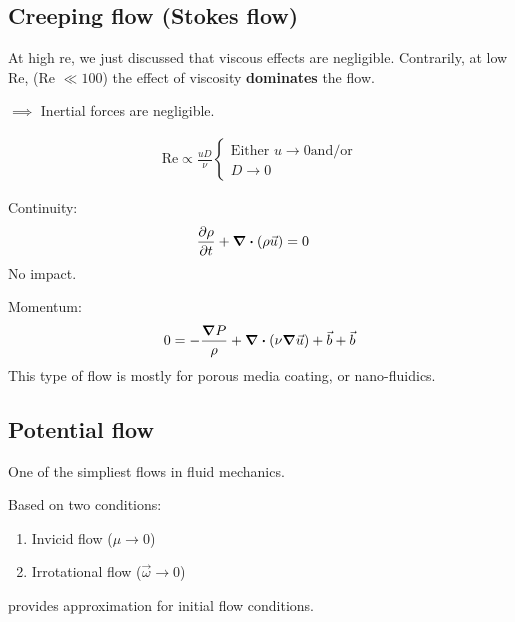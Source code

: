 \subsection*{Creeping flow (Stokes flow)}
At high re, we just discussed that viscous effects are negligible. Contrarily, at low 
Re, (Re $\ll 100$) the effect of viscosity \textbf{dominates} the flow. 

$\implies$ Inertial forces are negligible.

\begin{align*}
    \text{Re} \propto \frac{u D}{\nu} 
    \begin{cases}
        \text{Either } u \to 0 \text{and/or} \\
        D \to 0 
    \end{cases}
\end{align*}

Continuity:
\begin{align*}
    \frac{\partial \rho}{\partial t} + \divergence (\rho \vec{u}) &= 0
\end{align*}
No impact.

Momentum:
\begin{align*}
    0 = - \frac{\grad P}{\rho} +  \divergence (\nu \grad \vec{u}) + \vec{b} + \vec{b}
\end{align*}
This type of flow is mostly for porous media coating, or nano-fluidics.

\subsection*{Potential flow}
One of the simpliest flows in fluid mechanics.

Based on two conditions:
\begin{enumerate}
    \item Invicid flow ($\mu \to 0$)
    \item Irrotational flow ($\vec{\omega} \to 0$)
\end{enumerate}
provides approximation for initial flow conditions.